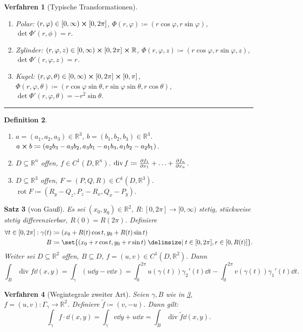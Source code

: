 \documentclass[a4paper]{article}
\newcounter{Sec}
\theoremstyle{marginbreak}
\newtheorem{definition}{Definition}[Sec]
\newtheorem{satz}[definition]{Satz}
\newtheorem{verfahren}[definition]{Verfahren}
\newcommand{\sep}{%
	\rule{\textwidth}{0.3pt}%
	\stepcounter{Sec}%
	}
\newcommand{\R}{\mathbb{R}}
\DeclareMathOperator{\ddiv}{div}
\DeclareMathOperator{\rot}{rot}
\begin{document}
	\begin{verfahren}[Typische Transformationen]
		\begin{enumerate}[label=(\alph*)]
			\item Polar: $(r,\varphi)\in [0,\infty)\cross[0,2\pi]$, $\Phi(r, \varphi)\coloneqq (r\cos\varphi, r\sin\varphi)$, $\det\Phi'(r,\phi)=r$.
			\item Zylinder: $(r, \varphi, z)\in [0,\infty)\cross [0,2\pi]\cross\R$, $\Phi(r, \varphi, z)\coloneqq(r\cos\varphi, r\sin\varphi, z)$,
				$\det\Phi'(r, \varphi, z)=r$.
			\item Kugel: $(r, \varphi,\theta)\in [0,\infty)\cross[0,2\pi]\cross[0,\pi]$,
				$\Phi(r, \varphi,\theta)\coloneqq(r\cos\varphi\sin\theta, r\sin\varphi\sin\theta, r\cos\theta)$,
				$\det\Phi'(r, \varphi, \theta)=-r^2\sin\theta$.
		\end{enumerate}
	\end{verfahren}
	\sep
	\begin{definition}
		\begin{enumerate}[label=(\alph*)]
			\item $a=(a_1, a_2, a_3)\in\R^3$, $b=(b_1, b_2, b_3)\in\R^3$. $a\cross b\coloneqq (a_2b_3-a_3b_2, a_3b_1 - a_1b_3, a_1b_2 - a_2b_1)$.
			\item $D\subseteq \R^n$ offen, $f\in C^1(D,\R^n)$. $\ddiv f\coloneqq \pdv{f_1}{x_1} + \ldots + \pdv{f_n}{x_n}$.
			\item $D\subseteq \R^3$ offen, $F=(P, Q, R)\in C^1(D, \R^3)$. $\rot F\coloneqq (R_y-Q_z, P_z-R_x,Q_x-P_y)$.
		\end{enumerate}
	\end{definition}
	\begin{satz}[von Gauß]\label{gauss}
		Es sei $(x_0, y_0)\in\R^2$, $R\colon[0, 2\pi]\to[0,\infty)$ stetig, stückweise stetig differenzierbar, $R(0) = R(2\pi)$. Definiere
		\begin{align*}
			\forall t\in[0,2\pi]: \gamma(t)&\coloneqq (x_0 + R(t)\cos t, y_0+R(t)\sin t)\\
			B&\coloneqq\set{(x_0+r\cos t, y_0+r\sin t)\given t\in[0, 2\pi], r\in[0, R(t)]}.
		\end{align*}
		Weiter sei $D\subseteq\R^2$ offen, $B\subseteq D$, $f=(u, v)\in C^1(D,\R^2)$. Dann
		\[
			\int_B\ddiv f\dd{(x, y)} = \int_\gamma(u\dd{y} - v\dd{x})
				= \int_0^{2\pi} u(\gamma(t))\gamma_2'(t)\dd{t} - \int_0^{2\pi} v(\gamma(t))\gamma_1'(t)\dd{t}.
		\]
	\end{satz}
	\begin{verfahren}[Wegintegrale zweiter Art]
			Seien $\gamma, B$ wie in \ref{gauss}, $f=(u, v)\colon\Gamma_{\gamma}\to\R^2$. Definiere
			$\tilde{f}\coloneqq (v, -u)$. Dann gilt:
			\[
				\int_\gamma f\cdot\dd{(x, y)} = \int_\gamma v\dd{y} + u\dd{x} = \int_B \ddiv\tilde{f}\dd{(x, y)}.
			\]
	\end{verfahren}
\end{document}
